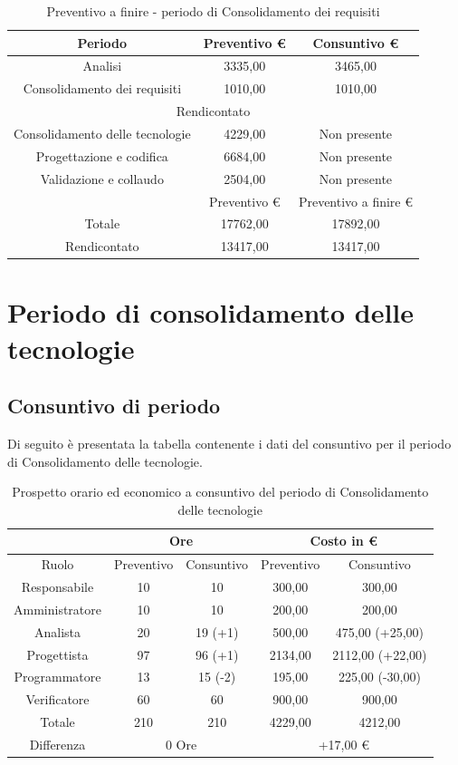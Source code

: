 \documentclass[./PianodiProgetto.tex]{subfiles}
\begin{document}
\begin{table}[H]
	\centering
	\begin{tabular}{|c|c|c|}
		\hline
		Periodo&Preventivo \euro{}&Consuntivo \euro{} \\ \hline
		Analisi&3335,00&3465,00  \\ \hline
		Consolidamento dei requisiti&1010,00&1010,00  \\ \hline
		\multicolumn{3}{|c|}{Rendicontato}  \\ \hline
		Consolidamento delle tecnologie&4229,00&Non presente  \\ \hline
		Progettazione e codifica&6684,00&Non presente  \\ \hline
		Validazione e collaudo&2504,00&Non presente  \\ \hline
		&Preventivo \euro{}&Preventivo a finire \euro{}  \\ \hline
		Totale&17762,00&17892,00 \\ \hline
		Rendicontato&13417,00&13417,00 \\ \hline
	\end{tabular}
	\caption{Preventivo a finire - periodo di Consolidamento dei requisiti}
\end{table}

\section{Periodo di consolidamento delle tecnologie}
\subsection{Consuntivo di periodo}
Di seguito è presentata la tabella contenente i dati del consuntivo per il
periodo di Consolidamento delle tecnologie.

\begin{table}[H]
	\centering                   
       \begin{tabular}{|c|c|c|c|c|}
		\hline
		& \multicolumn{2}{c|}{Ore} & \multicolumn{2}{c|}{Costo in \euro{}}  \\ \hline
		Ruolo&Preventivo&Consuntivo&Preventivo&Consuntivo \\ \hline
		Responsabile&10&10&300,00&300,00  \\ \hline
		Amministratore&10&10&200,00&200,00 \\ \hline
		Analista&20&19 (+1)&500,00&475,00 (+25,00)  \\ \hline
		Progettista&97&96 (+1)&2134,00&2112,00 (+22,00) \\ \hline
		Programmatore&13&15 (-2)&195,00&225,00 (-30,00)  \\ \hline
		Verificatore&60&60&900,00&900,00  \\ \hline
		Totale&210&210&4229,00&4212,00  \\ \hline
		Differenza& \multicolumn{2}{c|}{0 Ore} & \multicolumn{2}{c|}{+17,00 \euro{}} \\ \hline
	\end{tabular}
	\caption{Prospetto orario ed economico a consuntivo del periodo di Consolidamento delle tecnologie}
\end{table}
\end{document}
